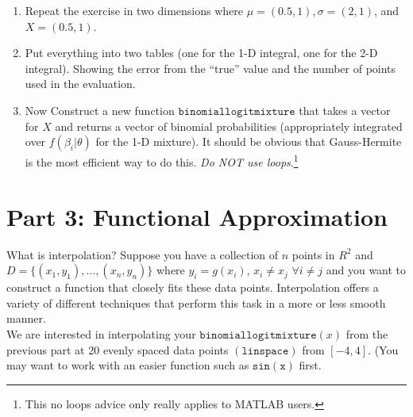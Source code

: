 \documentclass{article}
\begin{document}
\begin{enumerate}
\item Repeat the exercise in two dimensions where $\mu = (0.5,1), \sigma = (2,1)$, and $X=(0.5,1)$.
\item Put everything into two tables (one for the 1-D integral, one for the 2-D integral). Showing the error from the ``true'' value and the number of points used in the evaluation.
\begin{comment}
\begin{table}[htdp]
\caption{2-D Results True value: 0.7145}
\begin{center}
\begin{tabular}{l r r r }
Method & Points & Error\\
quad & n/a & 1e-14 \\
monte carlo & 100 &  0.0174\\
Gauss Hermite(PR) & 25 & 0.0250\\
SGI-GQN & 13 & 0.0091\\
SGI-KPN & 17 & -6.9355e-04\\
\end{tabular}
\end{center}
\end{table}%
\end{comment}
\item Now Construct a new function $\mathtt{binomiallogitmixture}$ that takes a vector for $X$ and returns a vector of binomial probabilities (appropriately integrated over $f(\beta_i | \theta)$ for the 1-D mixture). It should be obvious that Gauss-Hermite is the most efficient way to do this. \textit{Do NOT use loops}.\footnote{This no loops advice only really applies to MATLAB users.}
\end{enumerate}

\section*{Part 3: Functional Approximation}
What is interpolation? Suppose you have a collection of $n$ points in $R^2$ and $D=\{(x_1,y_1),\ldots,(x_n,y_n)\}$  where $y_i = g(x_i)$, $x_i \neq x_j$  $\forall i \neq j$ and you want to construct a function that closely fits these data points. Interpolation offers a variety of different techniques that perform this task in a more or less smooth manner.\\


We are interested in interpolating your $\mathtt{binomiallogitmixture}(x)$ from the previous part at 20 evenly spaced data points $(\mathtt{linspace})$ from $[-4,4]$. (You may want to work with an easier function such as $\mathtt{sin(x)}$ first.\\
\end{document}
